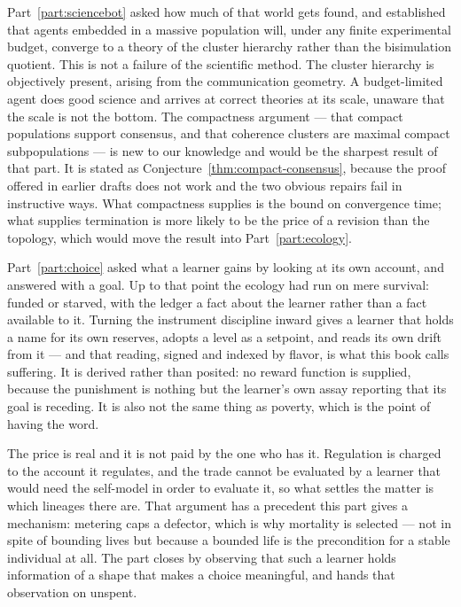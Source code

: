Part~\ref{part:sciencebot} asked how much of that world gets found, and
established that agents embedded in a massive population will, under any
finite experimental budget, converge to a theory of the cluster hierarchy
rather than the bisimulation quotient.
This is not a failure of the scientific method.
The cluster hierarchy is objectively present, arising from the
communication geometry.
A budget-limited agent does good science and arrives at correct theories
at its scale, unaware that the scale is not the bottom.
The compactness argument --- that compact populations support consensus,
and that coherence clusters are maximal compact subpopulations --- is new
to our knowledge and would be the sharpest result of that part.
It is stated as Conjecture~\ref{thm:compact-consensus}, because the
proof offered in earlier drafts does not work and the two obvious
repairs fail in instructive ways.
What compactness supplies is the bound on convergence time; what
supplies termination is more likely to be the price of a revision than
the topology, which would move the result into
Part~\ref{part:ecology}.

Part~\ref{part:choice} asked what a learner gains by looking at its own
account, and answered with a goal.
Up to that point the ecology had run on mere survival: funded or starved,
with the ledger a fact about the learner rather than a fact available to
it.
Turning the instrument discipline inward gives a learner that holds a
name for its own reserves, adopts a level as a setpoint, and reads its
own drift from it --- and that reading, signed and indexed by flavor, is
what this book calls suffering.
It is derived rather than posited: no reward function is supplied,
because the punishment is nothing but the learner's own assay reporting
that its goal is receding.
It is also not the same thing as poverty, which is the point of having
the word.

The price is real and it is not paid by the one who has it.
Regulation is charged to the account it regulates, and the trade cannot
be evaluated by a learner that would need the self-model in order to
evaluate it, so what settles the matter is which lineages there are.
That argument has a precedent this part gives a mechanism: metering caps
a defector, which is why mortality is selected --- not in spite of
bounding lives but because a bounded life is the precondition for a
stable individual at all.
The part closes by observing that such a learner holds information of a
shape that makes a choice meaningful, and hands that observation on
unspent.

